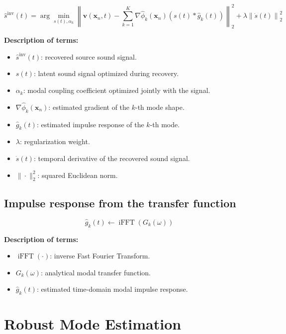 \documentclass[11pt]{article}
\begin{document}
\begin{equation}
\hat{s}^{\mathrm{inv}}(t)
=
\arg\min_{s(t),\alpha_k}
\left\|
\bm{v}(\bm{x}_n,t)
-
\sum_{k=1}^{K}
\nabla \hat{\phi}_k(\bm{x}_n)
\left(
s(t) * \hat{g}_k(t)
\right)
\right\|_2^2
+
\lambda
\left\|
\dot{s}(t)
\right\|_2^2
\end{equation}

\textbf{Description of terms:}

\begin{itemize}
    \item $\hat{s}^{\mathrm{inv}}(t)$: recovered source sound signal.
    \item $s(t)$: latent sound signal optimized during recovery.
    \item $\alpha_k$: modal coupling coefficient optimized jointly with the signal.
    \item $\nabla \hat{\phi}_k(\bm{x}_n)$: estimated gradient of the $k$-th mode shape.
    \item $\hat{g}_k(t)$: estimated impulse response of the $k$-th mode.
    \item $\lambda$: regularization weight.
    \item $\dot{s}(t)$: temporal derivative of the recovered sound signal.
    \item $\|\cdot\|_2^2$: squared Euclidean norm.
\end{itemize}

\subsection{Impulse response from the transfer function}

\begin{equation}
\hat{g}_k(t)
\leftarrow
\operatorname{iFFT}
\left(
G_k(\omega)
\right)
\end{equation}

\textbf{Description of terms:}

\begin{itemize}
    \item $\operatorname{iFFT}(\cdot)$: inverse Fast Fourier Transform.
    \item $G_k(\omega)$: analytical modal transfer function.
    \item $\hat{g}_k(t)$: estimated time-domain modal impulse response.
\end{itemize}

\section{Robust Mode Estimation}
\end{document}
